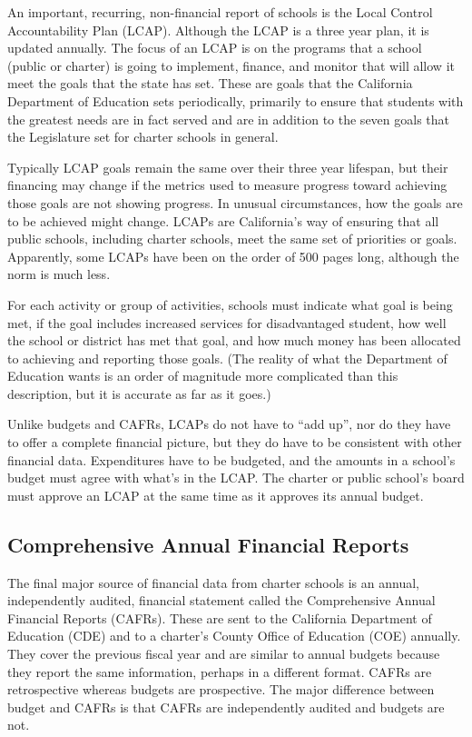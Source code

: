 An important, recurring, non-financial report of schools is the Local Control Accountability Plan (LCAP). Although the LCAP is a three year plan, it is updated annually. The focus of an LCAP is on the programs that a school (public or charter) is going to implement, finance, and monitor that will allow it meet the goals that the state has set. These are goals that the California Department of Education sets periodically, primarily to ensure that students with the greatest needs are in fact served and are in addition to the seven goals that the Legislature set for charter schools in general.

Typically LCAP goals remain the same over their three year lifespan, but their financing may change if the metrics used to measure progress toward achieving those goals are not showing progress. In unusual circumstances, how the goals are to be achieved might change. LCAPs are California's way of ensuring that all public schools, including charter schools, meet the same set of priorities or goals. Apparently, some LCAPs have been on the order of 500 pages long, although the norm is much less.

For each activity or group of activities, schools must indicate what goal is being met, if the goal includes increased services for disadvantaged student, how well the school or district has met that goal, and how much money has been allocated to achieving and reporting those goals. (The reality of what the Department of Education wants is an order of magnitude more complicated than this description, but it is accurate as far as it goes.)

Unlike budgets and CAFRs, LCAPs do not have to ``add up'', nor do they have to offer a complete financial picture, but they do have to be consistent with other financial data. Expenditures have to be budgeted, and the amounts in a school's budget must agree with what's in the LCAP\@. The charter or public school's board must approve an LCAP at the same time as it approves its annual budget. %

\subsection{Comprehensive Annual Financial Reports}\label{sec:CAFRs}\indent

The final major source of financial data from charter schools is an annual, independently audited, financial statement called the Comprehensive Annual Financial Reports (CAFRs). These are sent to the California Department of Education (CDE) and to a charter's County Office of Education (COE) annually. They cover the previous fiscal year and are similar to annual budgets because they report the same information, perhaps in a different format. CAFRs are retrospective whereas budgets are prospective. The major difference between budget and CAFRs is that CAFRs are independently audited and budgets are not. 

